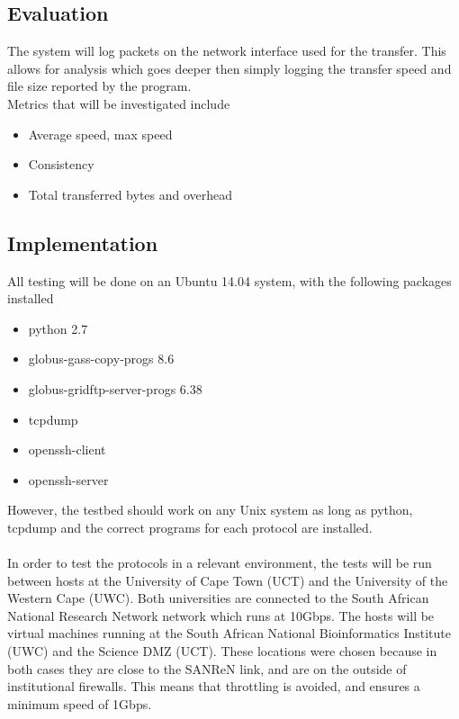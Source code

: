 \documentclass{sig-alternate-05-2015}
\begin{document}
\subsection{Evaluation}
The system will log packets on the network interface used for the transfer. This allows for analysis which goes deeper then simply logging the transfer speed and file size reported by the program.\\
Metrics that will be investigated include
\begin{itemize}
		\item Average speed, max speed
		\item Consistency
		\item Total transferred bytes and overhead
\end{itemize}

\subsection{Implementation}
All testing will be done on an Ubuntu 14.04 system, with the following packages installed
\begin{itemize}
	\item python 2.7
	\item globus-gass-copy-progs 8.6
	\item globus-gridftp-server-progs 6.38
	\item tcpdump
	\item openssh-client
	\item openssh-server
\end{itemize}
However, the testbed should work on any Unix system as long as python, tcpdump and the correct programs for each protocol are installed.
\\\\
In order to test the protocols in a relevant environment, the tests will be run between hosts at the University of Cape Town (UCT) and the University of the Western Cape (UWC). Both universities are connected to the South African National Research Network \cite{sanren} network which runs at 10Gbps. The hosts will be virtual machines running at the South African National Bioinformatics Institute (UWC) and the Science DMZ (UCT). These locations were chosen because in both cases they are close to the SANReN link, and are on the outside of institutional firewalls. This means that throttling is avoided, and ensures a minimum speed of 1Gbps.
\end{document}
